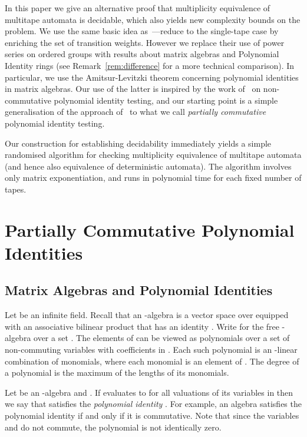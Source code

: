 \documentclass[runningheads]{llncs}
\begin{document}
In this paper we give an alternative proof that multiplicity
equivalence of multitape automata is decidable, which also yields new
complexity bounds on the problem.  We use the same basic idea
as~\cite{HarjuK91}---reduce to the single-tape case by enriching the
set of transition weights.  However we replace their use of power
series on ordered groups with results about matrix algebras and
Polynomial Identity rings (see Remark~\ref{rem:difference} for a more
technical comparison).  In particular, we use the Amitsur-Levitzki
theorem concerning polynomial identities in matrix algebras.  Our use
of the latter is inspired by the work of~\cite{BogdanovW05} on
non-commutative polynomial identity testing, and our starting point is
a simple generalisation of the approach of~\cite{BogdanovW05} to what
we call \emph{partially commutative} polynomial identity testing.

Our construction for establishing decidability immediately yields a
simple randomised algorithm for checking multiplicity equivalence of
multitape automata (and hence also equivalence of deterministic
automata).  The algorithm involves only matrix exponentiation, and
runs in polynomial time for each fixed number of tapes. 





\section{Partially Commutative Polynomial Identities}
\label{sec:semi}

\subsection{Matrix Algebras and Polynomial Identities}

Let  be an infinite field.  Recall that an -algebra is a vector
space over  equipped with an associative bilinear product that has
an identity .  Write  for the free -algebra
over a set .  The elements of  can be viewed as
polynomials over a set of non-commuting variables  with
coefficients in .  Each such polynomial is an -linear
combination of monomials, where each monomial is an element of .
The degree of a polynomial is the maximum of the lengths of its
monomials.

Let  be an -algebra and .  If 
evaluates to  for all valuations of its variables in  then we
say that  satisfies the \emph{polynomial identity} .  For
example, an algebra satisfies the polynomial identity  if and
only if it is commutative.  Note that since the variables  and
 do not commute, the polynomial  is not identically zero.
\end{document}
